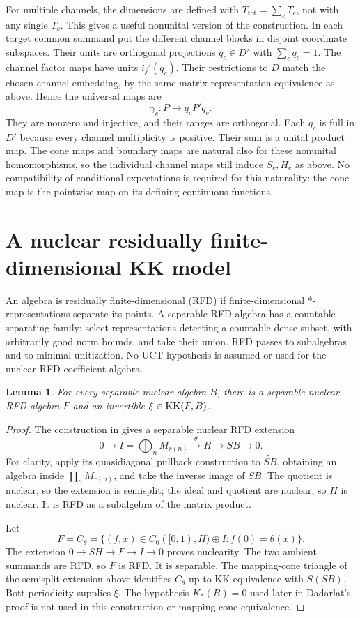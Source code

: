 \documentclass[11pt]{article}
\newtheorem{lemma}[theorem]{Lemma}
\theoremstyle{remark}\newtheorem{remark}[theorem]{Remark}
\begin{document}
For multiple channels, the dimensions are defined with
$T_{\mathrm{tot}}=\sum_cT_c$, not with any single $T_c$.
This gives a useful nonunital version of the construction. In each target
common summand put the different channel blocks in disjoint coordinate
subspaces. Their units are orthogonal projections $q_c\in D'$ with
$\sum_cq_c=1$. The channel factor maps have units $i_j'(q_c)$.
Their restrictions to $D$ match the chosen channel embedding, by the same
matrix representation equivalence as above. Hence the universal maps are
\[
                    \gamma_c:P\longrightarrow q_cP'q_c.
\]
They are nonzero and injective, and their ranges are orthogonal. Each
$q_c$ is full in $D'$ because every channel multiplicity is positive.
Their sum is a unital product map. The cone maps and boundary maps are
natural also for these nonunital homomorphisms, so the individual channel
maps still induce $S_c,H_c$ as above. No compatibility of conditional
expectations is required for this naturality: the cone map is the
pointwise map on its defining continuous functions.


\section{A nuclear residually finite-dimensional KK model}
An algebra is residually finite-dimensional (RFD) if finite-dimensional
*-representations separate its points. A separable RFD algebra has a
countable separating family: select representations detecting a countable
dense subset, with arbitrarily good norm bounds, and take their union.
RFD passes to subalgebras and to minimal unitization. No UCT hypothesis is assumed or used for the nuclear RFD
coefficient algebra.

\begin{lemma}\label{lem:rfd}
For every separable nuclear algebra $B$, there is a separable nuclear
RFD algebra $F$ and an invertible $\xi\in\operatorname{KK}(F,B)$.
\end{lemma}
\begin{proof}
The construction in \cite[Lemma 2.4 and proof of Theorem 1.2]{Dadarlat}
gives a separable nuclear RFD extension
\[
       0\longrightarrow I=\bigoplus_nM_{r(n)}
       \xrightarrow{\theta} H\longrightarrow SB\longrightarrow0.
\]
For clarity, apply its quasidiagonal pullback construction to
$\widetilde{SB}$, obtaining an algebra inside $\prod_nM_{r(n)}$,
and take the inverse image of $SB$. The quotient is nuclear, so the
extension is semisplit; the ideal and quotient are nuclear, so $H$ is
nuclear. It is RFD as a subalgebra of the matrix product.

Let
\[
 F=C_\theta=\{(f,x)\in C_0([0,1),H)\oplus I:f(0)=\theta(x)\}.
\]
The extension $0\to SH\to F\to I\to0$ proves nuclearity.
The two ambient summands are RFD, so $F$ is RFD. It is separable.
The mapping-cone triangle of the semisplit extension above identifies
$C_\theta$ up to KK-equivalence with $S(SB)$. Bott periodicity supplies
$\xi$. The hypothesis $K_*(B)=0$ used later in Dadarlat's proof is not
used in this construction or mapping-cone equivalence.
\end{proof}
\end{document}
